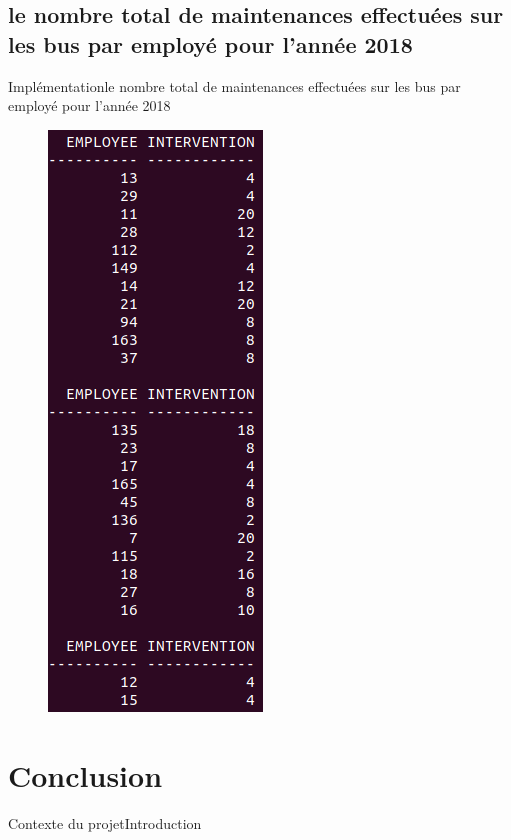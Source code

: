 \documentclass[usenames,dvipsnames]{beamer}
\begin{document}
\subsection{le nombre total de maintenances effectuées sur les bus par employé pour l'année 2018}
\begin{frame}{Implémentation}{le nombre total de maintenances effectuées sur les bus par employé pour l'année 2018}
\begin{figure}[!ht]
  \centering
  \includegraphics[scale=0.5]{images/requetes_analytiques/requ7.png}
\end{figure}
\end{frame}

\section{Conclusion}
\begin{frame}{Contexte du projet}{Introduction}
\end{frame}
\end{document}
